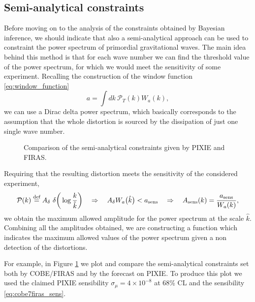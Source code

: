 \subsection{Semi-analytical constraints}
Before moving on to the analysis of the constraints obtained by Bayesian inference, we should indicate that also a semi-analytical approach can be used to constraint the power spectrum of primordial gravitational waves. The main idea behind this method is that for each wave number we can find the threshold value of the power spectrum, for which we would meet the sensitivity of some experiment. Recalling the construction of the window function \eqref{eq:window_function}
$$a=\int dk\ \mathcal P_T(k) W_a(k),$$
we can use a Dirac delta power spectrum, which basically corresponds to the assumption that the whole distortion is sourced by the dissipation of just one single wave number. 
\begin{figure}[h]
    \centering
{}
\caption{Comparison of  the semi-analytical constraints given by PIXIE and FIRAS.}
\label{fig:analy_const}
\end{figure}
Requiring that the resulting distortion meets the sensitivity of the considered experiment,
$$\mathcal P(k)\stackrel{\text{def}}{=} A_\delta\ \delta\bigg(\log\frac{k}{\hat k}\bigg)\quad \Rightarrow\quad A_\delta W_a\big(\hat k\big)<a_{\text{sens}}\quad \Rightarrow\quad A_{\text{sens}}(k)=\frac{a_{\text{sens}}}{W_a(k)},$$
we obtain the maximum allowed amplitude for the power spectrum at the scale $\hat k$. Combining all the amplitudes obtained, we are constructing a function which indicates the maximum allowed values of the power spectrum given a non detection of the distortions. 

For example, in Figure \ref{fig:analy_const} we plot and compare the semi-analytical constraints set both by COBE/FIRAS and by the forecast on PIXIE. To produce this plot we used the claimed PIXIE sensibility $\sigma_\mu=4\times10^{-8}$ at 68\% CL \cite{Chluba_2021} and the sensibility \eqref{eq:cobe7firas_sens}. 


